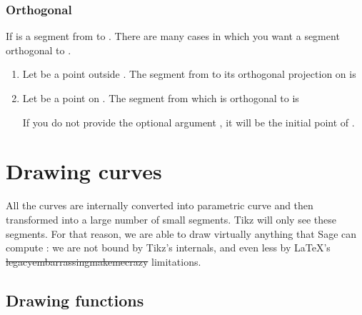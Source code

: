 \subsubsection{Orthogonal}

If  is a segment from  to . There are many cases in which you want a segment orthogonal to .

\begin{enumerate}
    \item
        Let  be a point outside . The segment from  to its orthogonal projection on  is

        
    \item
        Let  be a point on . The segment from  which is orthogonal to  is

        

        If you do not provide the optional argument , it will be the initial point of .
\end{enumerate}

\section{Drawing curves}

All the curves are internally converted into parametric curve and then transformed into a large number of small segments. Tikz will only see these segments. For that reason, we are able to draw virtually anything that Sage can compute : we are not bound by Tikz's internals, and even less by \LaTeX's \sout{legacyembarrassingmakemecrazy} limitations.

\subsection{Drawing functions}

